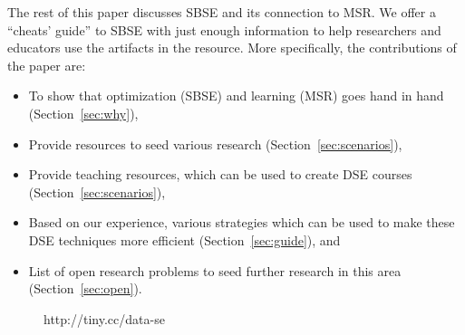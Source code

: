 \documentclass[sigconf,anonymous,review]{acmart}
\begin{document}

The rest of this paper discusses SBSE and its connection to MSR. 
We offer a ``cheats' guide'' to SBSE with just enough information to help researchers and educators use the artifacts in the resource. More specifically, the contributions of the paper are:
\begin{itemize}[leftmargin=*]
    \item To show that optimization (SBSE) and learning (MSR) goes hand in hand (Section~\ref{sec:why}),
    \item Provide resources to seed various research (Section~\ref{sec:scenarios}),
    \item Provide teaching resources, which can be used to create DSE courses (Section~\ref{sec:scenarios}),
    \item Based on our experience, various strategies which can be used to make these DSE techniques more efficient (Section~\ref{sec:guide}), and
    \item List of open research problems to seed further research in this area (Section~\ref{sec:open}). 
\end{itemize}


\begin{figure}[t]
 
{\center
{}}
\caption{http://tiny.cc/data-se}\label{fig:one}
\end{figure}
\end{document}
